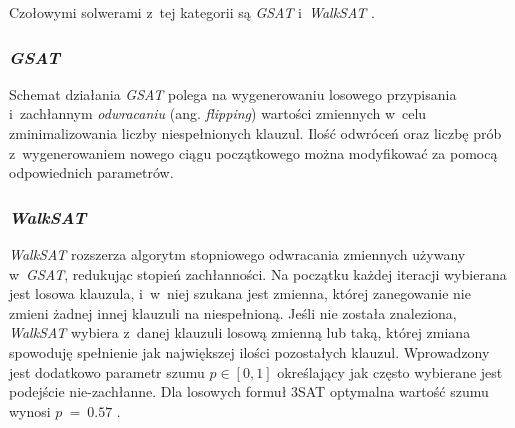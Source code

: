 Czołowymi solwerami z~tej kategorii są \textit{GSAT} i~\textit{WalkSAT} \cite{handbook-satifiability-incomplete}.


\subsubsection{\textit{GSAT}}
Schemat działania \textit{GSAT} polega na wygenerowaniu losowego przypisania i~zachłannym \textit{odwracaniu} (ang. \textit{flipping})
wartości zmiennych w~celu zminimalizowania liczby niespełnionych klauzul. Ilość odwróceń oraz liczbę prób
z~wygenerowaniem nowego ciągu początkowego można modyfikować za pomocą odpowiednich parametrów.

\subsubsection{\textit{WalkSAT}}
\textit{WalkSAT} rozszerza algorytm stopniowego odwracania zmiennych używany w~\textit{GSAT}, redukując stopień zachłanności.
Na początku każdej iteracji wybierana jest losowa klauzula, i~w~niej szukana jest zmienna, której zanegowanie nie zmieni żadnej
innej klauzuli na niespełnioną. Jeśli nie została znaleziona, \textit{WalkSAT} wybiera z~danej klauzuli losową zmienną lub taką, której
zmiana spowoduję spełnienie jak największej ilości pozostałych klauzul. Wprowadzony jest dodatkowo parametr szumu $p \in [0, 1]$ określający
jak często wybierane jest podejście nie-zachłanne. Dla losowych formuł 3SAT optymalna wartość szumu wynosi $p~=~0.57$ \cite{handbook-satifiability-incomplete}.

